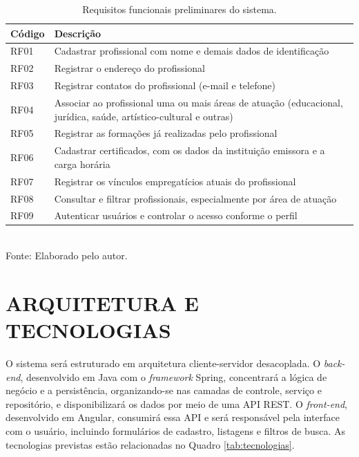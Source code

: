 \documentclass[
        oneside,      %
        english,			
        brazil			 
        ]{abntspiifac}
\begin{document}
\begin{table}[!htb]
\centering
\caption{Requisitos funcionais preliminares do sistema.}
\label{tab:requisitos}
\footnotesize
\begin{tabular}{>{\raggedright}p{2cm} p{10.5cm}}
\toprule
\textbf{Código} & \textbf{Descrição} \\
\midrule
RF01 & Cadastrar profissional com nome e demais dados de identificação \\
RF02 & Registrar o endereço do profissional \\
RF03 & Registrar contatos do profissional (e-mail e telefone) \\
RF04 & Associar ao profissional uma ou mais áreas de atuação (educacional, jurídica, saúde, artístico-cultural e outras) \\
RF05 & Registrar as formações já realizadas pelo profissional \\
RF06 & Cadastrar certificados, com os dados da instituição emissora e a carga horária \\
RF07 & Registrar os vínculos empregatícios atuais do profissional \\
RF08 & Consultar e filtrar profissionais, especialmente por área de atuação \\
RF09 & Autenticar usuários e controlar o acesso conforme o perfil \\
\bottomrule
\end{tabular}\\
{\footnotesize Fonte: Elaborado pelo autor.}
\end{table}

\section{ARQUITETURA E TECNOLOGIAS}

O sistema será estruturado em arquitetura cliente-servidor desacoplada. O \textit{back-end}, desenvolvido em Java com o \textit{framework} Spring, concentrará a lógica de negócio e a persistência, organizando-se nas camadas de controle, serviço e repositório, e disponibilizará os dados por meio de uma API REST. O \textit{front-end}, desenvolvido em Angular, consumirá essa API e será responsável pela interface com o usuário, incluindo formulários de cadastro, listagens e filtros de busca. As tecnologias previstas estão relacionadas no Quadro \ref{tab:tecnologias}.
\end{document}
